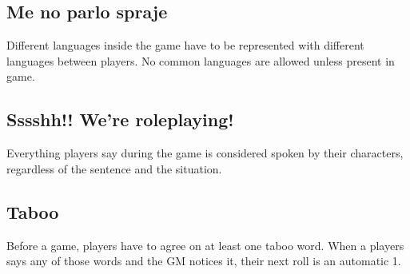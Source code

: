 \subsection*{Me no parlo spraje}

Different languages inside the game have to be represented with different languages between players. No common languages are allowed unless present in game.

\subsection*{Sssshh!! We're roleplaying!}

Everything players say during the game is considered spoken by their characters, regardless of the sentence and the situation.

\subsection*{Taboo}

Before a game, players have to agree on at least one taboo word. When a players says any of those words and the GM notices it, their next roll is an automatic 1.